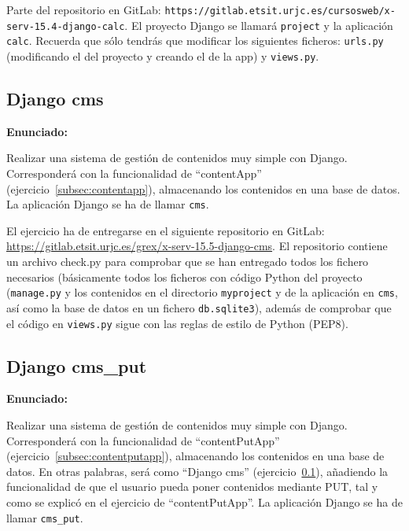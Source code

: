 Parte del repositorio en GitLab: \verb|https://gitlab.etsit.urjc.es/cursosweb/x-serv-15.4-django-calc|. El proyecto Django se llamará \texttt{project} y la aplicación \texttt{calc}. 
Recuerda que sólo tendrás que modificar los siguientes ficheros: \texttt{urls.py} (modificando el del proyecto y creando el de la app) y \texttt{views.py}. 

%

\subsection{Django cms}
\label{subsec:django-cms}

\textbf{Enunciado:}

Realizar una sistema de gestión de contenidos muy simple con Django. Corresponderá con la funcionalidad de ``contentApp'' (ejercicio~\ref{subsec:contentapp}), almacenando los contenidos en una base de datos. La aplicación Django se ha de llamar \texttt{cms}.

El ejercicio ha de entregarse en el siguiente repositorio en GitLab: 
\url{https://gitlab.etsit.urjc.es/grex/x-serv-15.5-django-cms}. El repositorio contiene
un archivo check.py para comprobar que se han entregado todos los fichero necesarios (básicamente todos los ficheros con código Python del proyecto (\texttt{manage.py} y los contenidos en el directorio \texttt{myproject} y de la aplicación en \texttt{cms}, así como la base de datos en un fichero \texttt{db.sqlite3}), además de comprobar que el código en
\texttt{views.py} sigue con las reglas de estilo de Python (PEP8).

%


\subsection{Django cms\_put}
\label{subsec:django-cms-put}

\textbf{Enunciado:}

Realizar una sistema de gestión de contenidos muy simple con Django. Corresponderá con la funcionalidad de ``contentPutApp'' (ejercicio~\ref{subsec:contentputapp}), almacenando los contenidos en una base de datos. En otras palabras, será como ``Django cms'' (ejercicio~\ref{subsec:django-cms}), añadiendo la funcionalidad de que el usuario pueda poner contenidos mediante PUT, tal y como se explicó en el ejercicio de ``contentPutApp''. La aplicación Django se ha de llamar \texttt{cms\_put}.


